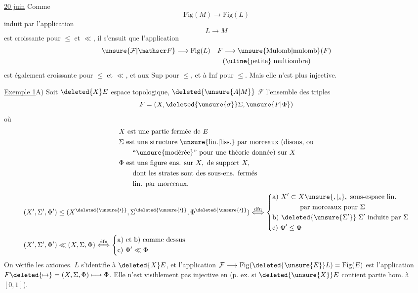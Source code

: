 
\uline{20 juin} Comme
\[
\mathrm{Fig}(M)\longrightarrow\mathrm{Fig}(L)
\]
induit par l'application
\[
L\longrightarrow M
\]
est croissante pour $\leq$ et $\ll$, il s'ensuit que l'application
\[
\begin{aligned}
{\unsure{\mathcal F|\mathscr F}}&\longrightarrow\mathrm{Fig}(L) & F&\longrightarrow\unsure{\mathrm{Mulomb}|\mathrm{mulomb}}(F)\\
&&&(\uline{\text{petite}}\ \text{multiombre})
\end{aligned}
\]
est également croissante pour $\leq$ et $\ll$, et  aux $\mathrm{Sup}$ pour $\leq$, et à $\mathrm{Inf}$ pour $\leq$. Mais elle n'est plus  injective.

\uline{Exemple 1}\quad {}A) Soit $\deleted{X}E$ espace topologique, $\deleted{\unsure{A|M}}$
$\mathcal F$ l'ensemble des   triples
\[
F=(X,\deleted{\unsure{\sigma}}\Sigma,\unsure{F|\Phi})
\]
où
\[
\begin{aligned}
&X\ \text{est une partie fermée de } E\\
&\Sigma\ \text{est une structure \unsure{lin.|liss.} par morceaux (disons, ou}\\
&\qquad\text{``\unsure{modérée}'' pour une théorie donnée) sur } X\\
&\Phi\ \text{est une figure ens. sur } X,\ \text{de support }X,\\
&\qquad\text{dont les strates sont des sous-ens. fermés}\\
&\qquad\text{lin. par morceaux.}
\end{aligned}
\]
\[
\begin{aligned}
(X',\Sigma',\Phi') &\leq (X^{\deleted{\unsure{\prime}}},\Sigma^{\deleted{\unsure{\prime}}},\Phi^{\deleted{\unsure{\prime}}})
\overset{\mathrm{dfn}}{\Longleftrightarrow}
\left\{\begin{aligned}
&\text{a) }X'\subset X\unsure{,|{}_{s}},\ \text{sous-espace lin.}\\
&\hspace{4em}\text{par morceaux pour }\Sigma\\
&\text{b) }\deleted{\unsure{\Sigma'} }\;\Sigma'\ \text{induite par }\Sigma\\
&\text{c) }\Phi'\leq\Phi
\end{aligned}\right.\\
(X',\Sigma',\Phi') &\ll (X,\Sigma,\Phi)
\overset{\mathrm{dfn}}{\Longleftrightarrow}
\left\{\begin{aligned}
&\text{a) et b) comme dessus}\\
&\text{c) }\Phi'\ll\Phi
\end{aligned}\right.
\end{aligned}
\]
On vérifie les axiomes.  $L$ s'identifie à $\deleted{X}E$, et l'application  $\mathcal F\longrightarrow\mathrm{Fig}(\deleted{\unsure{E}}L)=\mathrm{Fig}(E)$ est l'application $F\deleted{\mapsto}=(X,\Sigma,\Phi)\longmapsto\Phi$. Elle n'est visiblement pas injective en  (p. ex. si $\deleted{\unsure{X}}E$ contient partie hom. à $[0,1]$).

